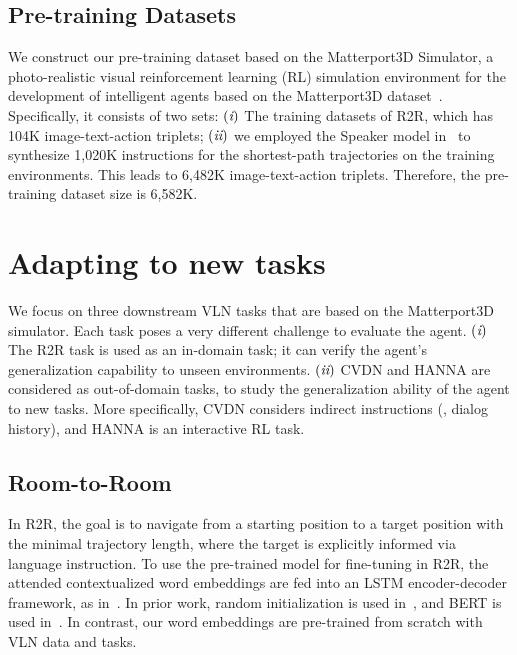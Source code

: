 \documentclass[10pt,twocolumn,letterpaper]{article}
\newcommand{\RN}[1]{\textup{\lowercase\expandafter{\it \romannumeral#1}}}
\begin{document}
\subsection{Pre-training Datasets}
We construct our pre-training dataset based on the Matterport3D Simulator, a photo-realistic visual reinforcement learning (RL) simulation environment for the development of intelligent agents based on the Matterport3D dataset~\cite{chang2017matterport3d}.
Specifically, it consists of two sets: 
$(\RN{1})$ The training datasets of R2R, which has 104K image-text-action triplets; 
$(\RN{2})$ we employed the Speaker model in~\cite{fried2018speaker} to synthesize 1,020K instructions for the shortest-path trajectories on the training environments. This leads to 6,482K image-text-action triplets. Therefore, the pre-training dataset size is 6,582K.


\section{Adapting to new tasks}
We focus on three downstream VLN tasks that are based on the Matterport3D simulator.
Each task poses a very different challenge to evaluate the agent. 
$(\RN{1})$ The R2R task is used as an in-domain task; it can verify the agent's generalization capability to unseen environments. 
$(\RN{2})$ CVDN and HANNA are considered as out-of-domain tasks, to study the generalization ability of the agent to new tasks. More specifically, CVDN considers indirect instructions (\ie, dialog history), and HANNA is an interactive RL task.

\subsection{Room-to-Room}
In R2R, the goal is to navigate from a starting position to a target position with the minimal trajectory length, where the target is explicitly informed via language instruction. To use the pre-trained model for fine-tuning in R2R, the attended contextualized word embeddings are fed into an LSTM encoder-decoder framework, as in~\cite{fried2018speaker,li2019robust}. In prior work, random initialization is used in~\cite{fried2018speaker}, and BERT is used in~\cite{li2019robust}. In contrast, our word embeddings are pre-trained from scratch with VLN data and tasks. 
\end{document}
